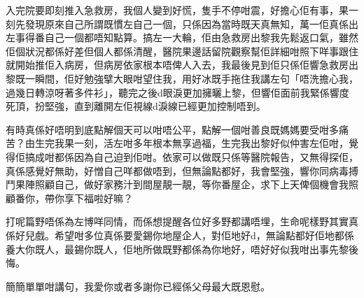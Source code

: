 入完院要即刻推入急救房，我個人變到好慌，隻手不停咁震，好擔心佢有事，果一刻先發現原來自己所謂既慣左自己一個，只係因為當時既天真無知，萬一佢真係出左事得番自己一個都唔知點算。搞左一大輪，佢由急救房出黎我先鬆返口氣，雖然佢個狀況都係好差但個人都係清醒，醫院果邊話留院觀察幫佢詳細咁照下咩事跟住就開始推佢入病房，但病房依家根本唔俾人入去，我最後見到佢只係佢響急救房出黎既一瞬間，佢好勉強擘大眼咁望住我，用好冰既手拖住我講左句「唔洗擔心我，過幾日轉涼呀著多件衫」，聽完之後d眼淚更加擁曬上黎，但響佢面前我緊係響度死頂，扮堅強，直到離開左佢視線d淚線已經更加控制唔到。

有時真係好唔明到底點解個天可以咁唔公平，點解一個咁善良既媽媽要受咁多痛苦？由生完我果一刻，活左咁多年根本無享過福，生完我出黎好似仲害左佢咁，覺得佢搞成咁都係因為自己迫到佢咁。依家可以做既只係等醫院報告，又無得探佢，真係感覺好無助，好憎自己咩都做唔到，但無論點都好，我會堅強，響你同病毒搏鬥果陣照顧自己，做好家務汁到間屋靚一靚，等你番屋企，求下上天俾個機會我照顧番你，帶你享下福啦好嘛？

打呢篇野唔係為左博咩同情，而係想提醒各位好多野都講唔埋，生命呢樣野其實真係好兒戲。希望咁多位真係要愛錫你地屋企人，對佢地好d，無論點都好佢地都係養大你既人，最錫你既人，佢地所做既野都係為你地好，唔好好似我咁出事先黎後悔。

簡簡單單咁講句，我愛你或者多謝你已經係父母最大既恩慰。

